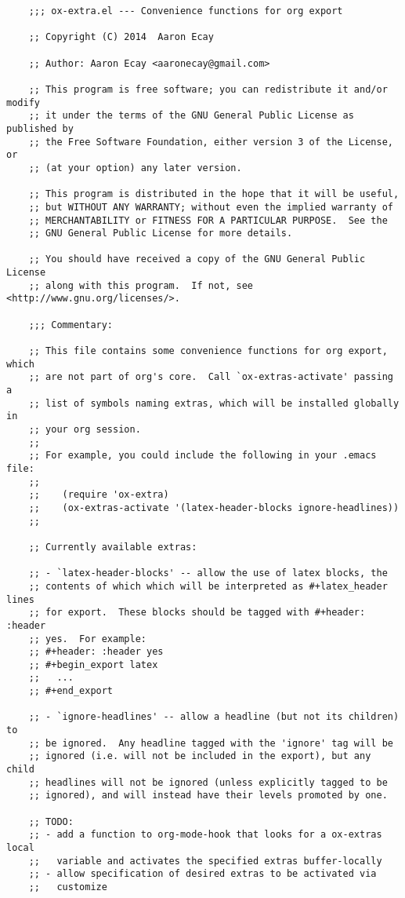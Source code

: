 \documentclass[11pt]{article}
\begin{document}
\begin{verbatim}
    ;;; ox-extra.el --- Convenience functions for org export

    ;; Copyright (C) 2014  Aaron Ecay

    ;; Author: Aaron Ecay <aaronecay@gmail.com>

    ;; This program is free software; you can redistribute it and/or modify
    ;; it under the terms of the GNU General Public License as published by
    ;; the Free Software Foundation, either version 3 of the License, or
    ;; (at your option) any later version.

    ;; This program is distributed in the hope that it will be useful,
    ;; but WITHOUT ANY WARRANTY; without even the implied warranty of
    ;; MERCHANTABILITY or FITNESS FOR A PARTICULAR PURPOSE.  See the
    ;; GNU General Public License for more details.

    ;; You should have received a copy of the GNU General Public License
    ;; along with this program.  If not, see <http://www.gnu.org/licenses/>.

    ;;; Commentary:

    ;; This file contains some convenience functions for org export, which
    ;; are not part of org's core.  Call `ox-extras-activate' passing a
    ;; list of symbols naming extras, which will be installed globally in
    ;; your org session.
    ;;
    ;; For example, you could include the following in your .emacs file:
    ;;
    ;;    (require 'ox-extra)
    ;;    (ox-extras-activate '(latex-header-blocks ignore-headlines))
    ;;

    ;; Currently available extras:

    ;; - `latex-header-blocks' -- allow the use of latex blocks, the
    ;; contents of which which will be interpreted as #+latex_header lines
    ;; for export.  These blocks should be tagged with #+header: :header
    ;; yes.  For example:
    ;; #+header: :header yes
    ;; #+begin_export latex
    ;;   ...
    ;; #+end_export

    ;; - `ignore-headlines' -- allow a headline (but not its children) to
    ;; be ignored.  Any headline tagged with the 'ignore' tag will be
    ;; ignored (i.e. will not be included in the export), but any child
    ;; headlines will not be ignored (unless explicitly tagged to be
    ;; ignored), and will instead have their levels promoted by one.

    ;; TODO:
    ;; - add a function to org-mode-hook that looks for a ox-extras local
    ;;   variable and activates the specified extras buffer-locally
    ;; - allow specification of desired extras to be activated via
    ;;   customize


\end{verbatim}
\end{document}

